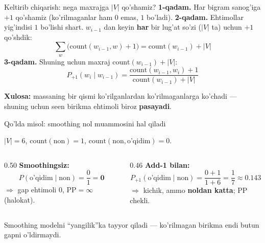 \documentclass[aspectratio=169,11pt]{beamer}
\begin{document}
\begin{frame}{Keltirib chiqarish: nega maxrajga $|V|$ qo'shamiz?}
  \textbf{1-qadam.} Har bigram sanog'iga $+1$ qo'shamiz (ko'rilmaganlar ham
  $0$ emas, $1$ bo'ladi).
  \pause
  \textbf{2-qadam.} Ehtimollar yig'indisi $1$ bo'lishi shart. $w_{i-1}$ dan
  keyin \textbf{har} bir lug'at so'zi ($|V|$ ta) uchun $+1$ qo'shdik:
  $$ \sum_{w}\big(\text{count}(w_{i-1},w)+1\big) = \text{count}(w_{i-1}) + |V| $$
  \pause
  \textbf{3-qadam.} Shuning uchun maxraj $\text{count}(w_{i-1}) + |V|$:
  $$ P_{+1}(w_i\mid w_{i-1}) = \frac{\text{count}(w_{i-1},w_i)+1}{\text{count}(w_{i-1})+|V|} $$
  \begin{tcolorbox}[okbox,top=2pt,bottom=2pt]
    \small \textbf{Xulosa:} massaning bir qismi ko'rilganlardan ko'rilmaganlarga
    ko'chadi --- shuning uchun seen birikma ehtimoli biroz \textbf{pasayadi}.
  \end{tcolorbox}
\end{frame}

\begin{frame}{Qo'lda misol: smoothing nol muammosini hal qiladi}
  \begin{tcolorbox}[defbox,title={Test birikmasi: (non, o'qidim) --- korpusda yo'q}]
    \small $|V|=6$, \; $\text{count}(\text{non})=1$, \;
    $\text{count}(\text{non},\text{o'qidim})=0$.
  \end{tcolorbox}
  \vspace{0.2em}
  \begin{columns}[T]
    \begin{column}{0.50\textwidth}
      \textbf{Smoothingsiz:}
      $$ P(\text{o'qidim}\mid\text{non}) = \frac{0}{1} = \mathbf{0} $$
      $\Rightarrow$ gap ehtimoli $0$, \; $\mathrm{PP}=\infty$ \alert{(halokat)}.
    \end{column}
    \begin{column}{0.46\textwidth}
      \textbf{Add-1 bilan:}
      $$ P_{+1}(\text{o'qidim}\mid\text{non}) = \frac{0+1}{1+6} = \frac{1}{7} \approx \mathbf{0.143} $$
      $\Rightarrow$ kichik, ammo \textbf{noldan katta}; $\mathrm{PP}$ chekli.
    \end{column}
  \end{columns}
  \vspace{4pt}
  \begin{tcolorbox}[okbox,top=2pt,bottom=2pt]
    \footnotesize
    Smoothing modelni ``yangilik''ka tayyor qiladi --- ko'rilmagan birikma endi
    butun gapni o'ldirmaydi.
  \end{tcolorbox}
\end{frame}
\end{document}
